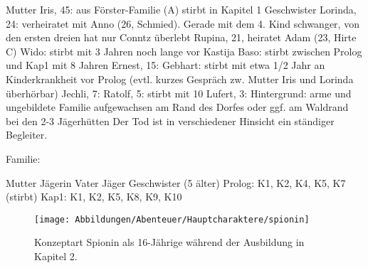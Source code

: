 \begin{outline}
		\2 Mutter Iris, 45: 
			\3 aus Förster-Familie (A)
			\3 stirbt in Kapitel 1
		\2 Geschwister
			\3 Lorinda, 24: verheiratet mit Anno (26, Schmied). Gerade mit dem 4. Kind schwanger, von den ersten dreien hat nur Conntz überlebt
			\3 Rupina, 21, heiratet Adam (23, Hirte C)
			\3 Wido: stirbt mit 3 Jahren noch lange vor Kastija
			\3 Baso: stirbt zwischen Prolog und Kap1 mit 8 Jahren
			\3 Ernest, 15: 
			\3 Gebhart: stirbt mit etwa 1/2 Jahr an Kinderkrankheit vor Prolog (evtl. kurzes Gespräch zw. Mutter Iris und Lorinda überhörbar)
			\3 Jechli, 7:
			\3 Ratolf, 5: stirbt mit 10
			\3 Lufert, 3:
	\1 Hintergrund:
		\2 arme und ungebildete Familie
		\2 aufgewachsen am Rand des Dorfes oder ggf. am Waldrand bei den 2-3 Jägerhütten
		\2 Der Tod ist in verschiedener Hinsicht ein ständiger Begleiter. 
\end{outline}

Familie:
\begin{outline}
	\1 Mutter Jägerin
	\1 Vater Jäger
		 Geschwister (5 älter)
		\2 Prolog: K1, K2, K4, K5, K7 (stirbt)
		\2 Kap1: K1, K2, K5, K8, K9, K10
\end{outline}

\begin{figure}[tbh]
	\centering
	\texttt{[image: Abbildungen/Abenteuer/Hauptcharaktere/spionin]}
	\caption[Konzeptart Spionin]{Konzeptart Spionin als 16-Jährige während der Ausbildung in Kapitel 2.}
	\label{fig:mc-spionin}
\end{figure}
